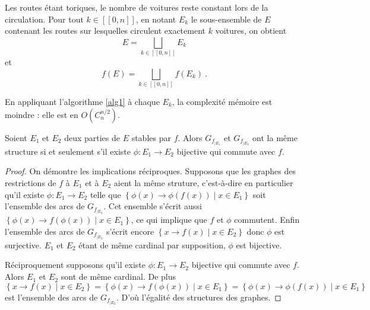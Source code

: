 \begin{lem}
Les routes \'etant toriques, le nombre de voitures reste constant lors de la circulation. Pour tout $k\in [\![0, n]\!]$, en notant $E_k$ le sous-ensemble de $E$ contenant les routes sur lesquelles circulent exactement $k$ voitures, on obtient \[E = \underset{k\in [\![0, n]\!]}{\bigsqcup} E_k\] et \[f(E) = \underset{k\in [\![0, n]\!]}{\bigsqcup} f(E_{k})\ \text{.}\]
\par
\end{lem}

\begin{csq}
En appliquant l'algorithme \ref{alg1} \`a chaque $E_k$, la complexit\'e m\'emoire est moindre : elle est en $O(C^{n/2}_{n})$.
\end{csq}

\begin{thm}\label{eg}
Soient $E_1$ et $E_2$ deux parties de $E$ stables par $f$. Alors $G_{f_{|E_{1}}}$ et $G_{f_{|E_{2}}}$ ont la m\^eme structure si et seulement s'il existe $\phi:E_{1}\rightarrow E_{2}$ bijective qui commute avec $f$.
\end{thm}
\begin{proof}
On d\'emontre les implications r\'eciproques.
Supposons que les graphes des restrictions de $f$ \`a $E_1$ et \`a $E_2$ aient la m\^eme struture, c'est-\`a-dire en particulier qu'il existe $\phi:E_{1}\rightarrow E_{2}$ telle que $\left\{\phi(x)\rightarrow \phi(f(x)) \middle| x\in E_{1}\right\}$ soit l'ensemble des arcs de $G_{f_{|E_{2}}}$. Cet ensemble s'\'ecrit aussi $\left\{\phi(x)\rightarrow f(\phi(x)) \middle| x\in E_{1}\right\}$, ce qui implique que $f$ et $\phi$ commutent. Enfin l'ensemble des arcs de $G_{f_{|E_{2}}}$ s'\'ecrit encore $\left\{x\rightarrow f(x) \middle| x\in E_{2}\right\}$ donc $\phi$ est surjective. $E_1$ et $E_2$ \'etant de m\^eme cardinal par supposition, $\phi$ est bijective.

R\'eciproquement supposons qu'il existe $\phi:E_{1}\rightarrow E_{2}$ bijective qui commute avec $f$. Alors $E_1$ et $E_2$ sont de m\^eme cardinal. De plus $\left\{x\rightarrow f(x) \middle| x\in E_{2}\right\}=\left\{\phi(x)\rightarrow f(\phi(x)) \middle| x\in E_{1}\right\}=\left\{\phi(x)\rightarrow \phi(f(x)) \middle| x\in E_{1}\right\}$ est l'ensemble des arcs de $G_{f_{|E_{2}}}$. D'o\`u l'\'egalit\'e des structures des graphes.
\end{proof}

